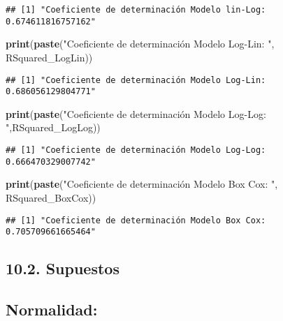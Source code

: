\documentclass[
]{article}
\newenvironment{Shaded}{\begin{snugshade}}{\end{snugshade}}
\newcommand{\FunctionTok}[1]{\textcolor[rgb]{0.13,0.29,0.53}{\textbf{#1}}}
\newcommand{\NormalTok}[1]{#1}
\newcommand{\StringTok}[1]{\textcolor[rgb]{0.31,0.60,0.02}{#1}}
\begin{document}
\begin{verbatim}
## [1] "Coeficiente de determinación Modelo lin-Log:  0.674611816757162"
\end{verbatim}

\begin{Shaded}
\begin{Highlighting}[]
\FunctionTok{print}\NormalTok{(}\FunctionTok{paste}\NormalTok{(}\StringTok{"Coeficiente de determinación Modelo Log{-}Lin: "}\NormalTok{, RSquared\_LogLin))}
\end{Highlighting}
\end{Shaded}

\begin{verbatim}
## [1] "Coeficiente de determinación Modelo Log-Lin:  0.686056129804771"
\end{verbatim}

\begin{Shaded}
\begin{Highlighting}[]
\FunctionTok{print}\NormalTok{(}\FunctionTok{paste}\NormalTok{(}\StringTok{"Coeficiente de determinación Modelo Log{-}Log: "}\NormalTok{,RSquared\_LogLog))}
\end{Highlighting}
\end{Shaded}

\begin{verbatim}
## [1] "Coeficiente de determinación Modelo Log-Log:  0.666470329007742"
\end{verbatim}

\begin{Shaded}
\begin{Highlighting}[]
\FunctionTok{print}\NormalTok{(}\FunctionTok{paste}\NormalTok{(}\StringTok{"Coeficiente de determinación Modelo Box Cox: "}\NormalTok{, RSquared\_BoxCox))}
\end{Highlighting}
\end{Shaded}

\begin{verbatim}
## [1] "Coeficiente de determinación Modelo Box Cox:  0.705709661665464"
\end{verbatim}

\subsection{\texorpdfstring{\textbf{10.2.
Supuestos}}{10.2. Supuestos}}\label{supuestos}

\subsection{\texorpdfstring{\textbf{Normalidad:}}{Normalidad:}}\label{normalidad}
\end{document}
